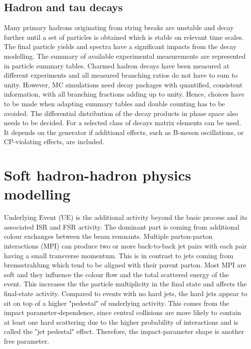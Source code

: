 \subsection{Hadron and tau decays}

Many primary hadrons originating from string breaks are unstable and decay further until a set of particles is obtained which is stable on relevant time scales. The final particle yields and spectra have a significant impacts from the decay modelling. The summary of available experimental measurements are represented in particle summary tables. Charmed hadron decays have been measured at different experiments and all measured branching ratios do not have to sum to unity. However, MC simulations need decay packages with quantified, consistent information, with all branching fractions adding up to unity. Hence, choices have to be made when adapting summary tables and double counting has to be avoided. The differential distribution of the decay products in phase space also needs to be decided. For a selected class of decays matrix elements can be used. It depends on the generator if additional effects, such as B-meson oscillations, or CP-violating effects, are included.


\section{Soft hadron-hadron physics modelling}

Underlying Event (UE) is the additional activity beyond the basic process and its associated ISR and FSR activity. The dominant part is coming from additional colour exchanges between the beam remnants. Multiple parton-parton interactions (MPI) can produce two or more back-to-back jet pairs with each pair having a small transverse momentum. This is in contrast to jets coming from bremsstrahlung which tend to be aligned with their parent parton. Most MPI are soft and they influence the colour flow and the total scattered energy of the event. This increases the the particle multiplicity in the final state and affects the final-state activity. Compared to events with no hard jets, the hard jets appear to sit on top of a higher "pedestal" of underlying activity. This comes from the impact parameter-dependence, since central collisions are more likely to contain at least one hard scattering due to the higher probability of interactions and is called the "jet pedestal" effect. Therefore, the impact-parameter shape is another free parameter.



